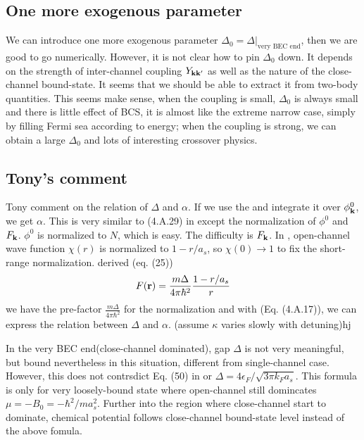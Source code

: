 \subsection{One more exogenous parameter}
We can introduce one more exogenous parameter $\Delta_{0}=\Delta|_\text{very BEC end}$, then we are good to go numerically.  However, it is not clear how to pin $\Delta_{0}$ down.  It depends on the strength of inter-channel coupling $Y_{\mathbf{k}\mathbf{k}'}$ as well as the nature of the close-channel bound-state.  It seems that we should be able to extract it from two-body quantities.  This seems make sense, when the coupling is small, $\Delta_{0}$ is always small and there is little effect of BCS, it is almost like the extreme narrow case, simply by filling Fermi sea according to energy; when the coupling is strong, we can obtain a large $\Delta_{0}$ and lots of interesting crossover physics.  

\subsection{Tony's comment}
Tony comment on the relation of $\Delta$ and $\alpha$.  If we use the  and integrate it over $\phi^{0}_{\mathbf{k}}$, we get $\alpha$.  This is very similar to (4.A.29) in \cite{Leggett} except the normalization of $\phi^{0}$ and $F_{\mathbf{k}}$.  $\phi^{0}$ is normalized to $N$, which is easy.  The difficulty is $F_{\mathbf{k}}$.  In \cite{Leggett}, open-channel wave function $\chi(r)$ is normalized to $1-r/a_{s}$, so $\chi(0)\rightarrow1$ to fix the short-range normalization.  \cite{shizhongSumRule} derived  (eq. (25))
\begin{equation}\label{eq:20101025:fr}
F(\mathbf{r})=\frac{m\Delta}{4\pi\hbar^{2}}\frac{1-r/a_{s}}{r}
\end{equation}
we have the pre-factor $\frac{m\Delta}{4\pi\hbar^{2}}$ for the normalization and with \cite{Leggett} (Eq. (4.A.17)), we can express the relation between $\Delta$ and $\alpha$.  (assume $\kappa$ varies slowly with detuning)hj

In the very BEC end(close-channel dominated), gap $\Delta$ is not very meaningful, but bound nevertheless in this situation, different from single-channel case.  However, this does not contrsdict Eq. (50) in \cite{shizhongUniv} or $\Delta=4\epsilon_F/\sqrt{3\pi{}k_Fa_s}$.  This formula is only for very loosely-bound state where open-channel still domincates $\mu=-B_0=-\hbar^2/ma_s^2$. Further into the region where close-channel start to dominate, chemical potential follows close-channel bound-state  level instead of the above fomula. 